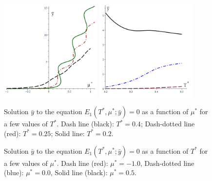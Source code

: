 \documentclass[12pt]{article}
\numberwithin{equation}{section}
\begin{document}
	\begin{figure}[htbp]
		\includegraphics[width=0.45\textwidth,angle=0]{images/YvsMu_a1}
		\hfill
		\includegraphics[width=0.45\textwidth,angle=0]{images/YvsT_a2}
		\\
		\parbox{0.45\textwidth}{\caption{\label{fig:YvsMu_a1} Solution $\bar{y}$ to the equation $E_1(T^*,\mu^*;\bar{y})=0$ as a function of $\mu^*$ for a few values of $T^*$. Dash line (black): $T^* = 0.4$; Dash-dotted line (red): $T^* = 0.25$; Solid line: $T^*=0.2$.}}
		\hfill
		\parbox{0.45\textwidth}{\caption{\label{fig:YvsT_a2} Solution $\bar{y}$ to the equation $E_1(T^*,\mu^*;\bar{y})=0$ as a function of $T^*$ for a few values of $\mu^*$. Dash line (red): $\mu^* = -1.0$, Dash-dotted line (blue): $\mu^* = 0.0$, Solid line (black): $\mu^* = 0.5$.}}
	\end{figure}
	
\end{document}
